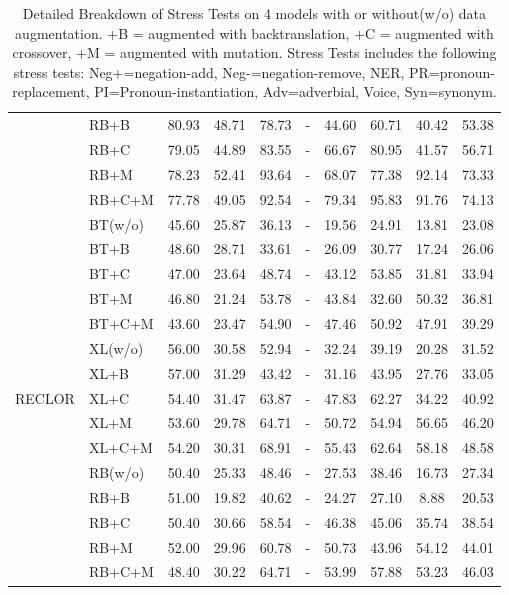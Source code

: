 \documentclass[runningheads]{llncs}
\begin{document}
\begin{table}[th]
\begin{tabular}{ll|c|ccccccc}
&RB+B&80.93 &48.71 &78.73 &-&44.60 &60.71 &40.42 &53.38 \\ 
&RB+C&79.05 &44.89 &83.55 &-&66.67 &80.95 &41.57 &56.71 \\ 
&RB+M&78.23 &52.41 &93.64 &-&68.07 &77.38 &92.14 &73.33 \\ 
&RB+C+M&77.78 &49.05 &92.54 &-&79.34 &95.83 &91.76 &74.13 \\ 
\hline
\multirow{15}{*}{RECLOR} 
&BT(w/o)&45.60 &25.87 &36.13 &-&19.56 &24.91 &13.81 &23.08\\ 
&BT+B&48.60 &28.71 &33.61 &-&26.09 &30.77 &17.24 &26.06\\ 
&BT+C&47.00 &23.64 &48.74 &-&43.12 &53.85 &31.81 &33.94\\ 
&BT+M&46.80 &21.24 &53.78 &-&43.84 &32.60 &50.32 &36.81\\ 
&BT+C+M&43.60 &23.47 &54.90 &-&47.46 &50.92 &47.91 &39.29\\ 
\cline{2-10}
&XL(w/o)&56.00 &30.58 &52.94 &-&32.24 &39.19 &20.28 &31.52\\ 
&XL+B&57.00 &31.29 &43.42 &-&31.16 &43.95 &27.76 &33.05\\ 
&XL+C&54.40 &31.47 &63.87 &-&47.83 &62.27 &34.22 &40.92\\ 
&XL+M&53.60 &29.78 &64.71 &-&50.72 &54.94 &56.65 &46.20\\ 
&XL+C+M&54.20 &30.31 &68.91 &-&55.43 &62.64 &58.18 &48.58\\ 
\cline{2-10}
&RB(w/o)&50.40 &25.33 &48.46 &-&27.53 &38.46 &16.73 &27.34\\ 
&RB+B&51.00 &19.82 &40.62 &-&24.27 &27.10 &8.88 &20.53\\ 
&RB+C&50.40 &30.66 &58.54 &-&46.38 &45.06 &35.74 &38.54\\ 
&RB+M&52.00 &29.96 &60.78 &-&50.73 &43.96 &54.12 &44.01\\ 
&RB+C+M&48.40 &30.22 &64.71 &-&53.99 &57.88 &53.23 &46.03\\ 



\bottomrule
\hline
\end{tabular}
\caption{\label{tab:results} Detailed Breakdown of Stress Tests
on 4 models with or without(w/o) data augmentation. 
+B = augmented with backtranslation,
+C = augmented with crossover, +M = augmented with mutation. 
Stress Tests includes the following stress tests: 
Neg+=negation-add, Neg-=negation-remove, NER, 
PR=pronoun-replacement, PI=Pronoun-instantiation, Adv=adverbial, Voice, Syn=synonym.}
\end{table}
\end{document}
